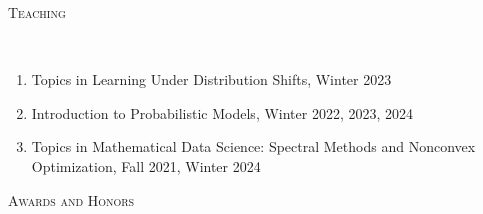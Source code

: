 \documentclass[a4paper, 10pt]{article}
\newenvironment{changemargin}[2]{%
  \begin{list}{}{%
    \setlength{\topsep}{0pt}%
    \setlength{\leftmargin}{#1}%
    \setlength{\rightmargin}{#2}%
    \setlength{\listparindent}{\parindent}%
    \setlength{\itemindent}{\parindent}%
    \setlength{\parsep}{\parskip}%
  }%
  \item[]}{\end{list}
}
\newcommand{\lineover}{
	\begin{changemargin}{-0.05in}{-0.05in}
		\vspace*{-8pt}
		\hrulefill \\
		\vspace*{-2pt}
	\end{changemargin}
}
\newcommand{\header}[1]{
	\begin{changemargin}{-0.5in}{-0.5in}
		\scshape{#1}\\
  	\lineover
	\end{changemargin}
}
\newenvironment{body} {
	\vspace*{-16pt}
	\begin{changemargin}{-0.3in}{-0.5in}
  }	
	{\end{changemargin}
}
\begin{document}
%
\bigskip
\header{\LARGE{Teaching}}
\begin{body}
	\vspace{18pt}
	\begin{enumerate}
	\item Topics in Learning Under Distribution Shifts, Winter 2023
	\item Introduction to Probabilistic Models, Winter 2022, 2023, 2024
	\item Topics in Mathematical Data Science: Spectral Methods and Nonconvex Optimization, Fall 2021, Winter 2024 
	\end{enumerate}
\end{body}


%

\bigskip

\header{\LARGE{Awards and Honors}}
\end{document}
